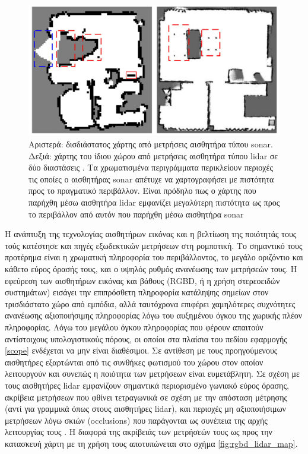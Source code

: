 \begin{figure}\centering
  \includegraphics[scale=0.5]{./figures/parts/01/chapters/01/sections/01/sonar_lidar_map.png}
  \caption{\small Αριστερά: δισδιάστατος χάρτης από μετρήσεις αισθητήρα τύπου
           sonar. Δεξιά: χάρτης του ίδιου χώρου από μετρήσεις αισθητήρα τύπου
           lidar σε δύο διαστάσεις \cite{Qi2020}. Τα χρωματισμένα περιγράμματα
           περικλείουν περιοχές τις οποίες ο αισθητήρας sonar απέτυχε να
           χαρτογραφήσει με πιστότητα προς το πραγματικό περιβάλλον. Είναι
           πρόδηλο πως ο χάρτης που παρήχθη μέσω αισθητήρα lidar εμφανίζει
           μεγαλύτερη πιστότητα ως προς το περιβάλλον από αυτόν που παρήχθη
           μέσω αισθητήρα sonar}
  \label{fig:sonar_lidar_map}
\end{figure}

Η ανάπτυξη της τεχνολογίας αισθητήρων εικόνας και η βελτίωση της ποιότητάς τους
τούς κατέστησε και πηγές εξωδεκτικών μετρήσεων στη ρομποτική. Το σημαντικό τους
προτέρημα είναι η χρωματική πληροφορία του περιβάλλοντος, το μεγάλο οριζόντιο
και κάθετο εύρος όρασής τους, και ο υψηλός ρυθμός ανανέωσης των μετρήσεών τους.
Η εφεύρεση των αισθητήρων εικόνας και βάθους (RGBD, ή η χρήση στερεοειδών
συστημάτων) εισάγει την επιπρόσθετη πληροφορία κατάληψης σημείων στον
τρισδιάστατο χώρο από εμπόδια, αλλά ταυτόχρονα επιφέρει χαμηλότερες συχνότητες
ανανέωσης αξιοποιήσιμης πληροφορίας λόγω του αυξημένου όγκου της χωρικής πλέον
πληροφορίας. Λόγω του μεγάλου όγκου πληροφορίας που φέρουν απαιτούν
αντίστοιχους υπολογιστικούς πόρους, οι οποίοι στα πλαίσια του πεδίου εφαρμογής
\ref{scope} ενδέχεται να μην είναι διαθέσιμοι. Σε αντίθεση με τους
προηγούμενους αισθητήρες εξαρτώνται από τις συνθήκες φωτισμού του χώρου στον
οποίον λειτουργούν και συνεπώς η ποιότητα των μετρήσεων είναι ευμετάβλητη. Σε
σχέση με τους αισθητήρες lidar εμφανίζουν σημαντικά περιορισμένο γωνιακό εύρος
όρασης, ακρίβεια μετρήσεων που φθίνει τετραγωνικά σε σχέση με την απόσταση
μέτρησης (αντί για γραμμικά όπως στους αισθητήρες lidar), και περιοχές μη
αξιοποιήσιμων μετρήσεων λόγω σκιών (occlusions) που παράγονται ως συνέπεια της
αρχής λειτουργίας τους \cite{Mallick2014}. Η διαφορά της ακρίβειάς των
μετρήσεών τους ως προς την κατασκευή χάρτη με τη χρήση τους αποτυπώνεται στο
σχήμα \ref{fig:rgbd_lidar_map}.

